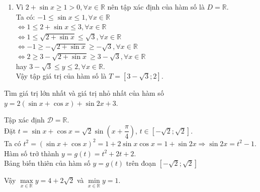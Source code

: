 \begin{ex}
{\begin{enumerate}
			      Vậy tập giá trị của hàm số là $T=\left[-9;-5\right]$.
			\item Vì $2+\sin x\ge 1>0,\forall x\in \mathbb{R}$ nên tập xác định của hàm số là $D=\mathbb{R}$.\\
			      Ta có: $-1\le \sin x\le 1,\forall x\in \mathbb{R}$\\
			      $\Leftrightarrow 1\le 2+\sin x\le 3,\forall x\in \mathbb{R}$\\
			      $\Leftrightarrow 1\le \sqrt{2+\sin x}\le \sqrt{3},\forall x\in \mathbb{R}$\\
			      $\Leftrightarrow -1\ge -\sqrt{2+\sin x}\ge -\sqrt{3},\forall x\in \mathbb{R}$\\
			      $\Leftrightarrow 2\ge 3-\sqrt{2+\sin x}\ge 3-\sqrt{3},\forall x\in \mathbb{R}$\\
			      hay $3-\sqrt{3}\le y\le 2,\forall x\in \mathbb{R}$.\\
			      Vậy tập giá trị của hàm số là $T=\left[3-\sqrt{3};2\right]$.
		\end{enumerate}
	}
\end{ex}

\begin{ex}%
	Tìm giá trị lớn nhất và giá trị nhỏ nhất của hàm số  $y=2(\sin x+\cos x)+\sin 2 x+3$.
	\loigiai
	{Tập xác định $\mathscr{D}=\mathbb{R}$.\\
		Đặt $t=\sin x+ \cos x=\sqrt{2}\sin \left(x+\dfrac{\pi}{4}\right)$, $t\in \left[-\sqrt{2};\sqrt{2}\right]$.\\
		Ta có $t^2=\left(\sin x+ \cos x\right)^2=1+2\sin x\cos x=1+\sin 2x\Rightarrow \sin 2x =t^2-1$.\\
		Hàm số trở thành $y=g(t)=t^2+2t+2$. \\
		Bảng biến thiên của hàm số $y=g(t)$ trên đoạn $ \left[-\sqrt{2};\sqrt{2}\right]$
		\begin{center}
		\end{center}
		Vậy $\max\limits_{x \in \mathbb{R}} y=4+2\sqrt{2}$ và $\min\limits_{x \in \mathbb{R}} y=1$.
	}
\end{ex}

